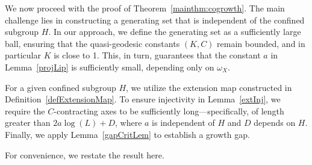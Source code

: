 \documentclass{amsart}
\numberwithin{thm}{section}
\numberwithin{figure}{section}
\theoremstyle{definition}
\theoremstyle{definition}
\theoremstyle{remark}
\numberwithin{equation}{section}
\theoremstyle{plain}
\begin{document}
We now proceed with the proof of Theorem~\ref{mainthm:cogrowth}. The main challenge lies in constructing a generating set that is independent of the confined subgroup $H$. In our approach, we define the generating set as a sufficiently large ball, ensuring that the quasi-geodesic constants $(K, C)$ remain bounded, and in particular $K$ is close to 1. This, in turn, guarantees that the constant $a$ in Lemma~\ref{projLip} is sufficiently small, depending only on $\omega_X$. 

For a given confined subgroup $H$, we utilize the extension map constructed in Definition~\ref{defExtensionMap}. To ensure injectivity in Lemma~\ref{extInj}, we require the $C$-contracting axes to be sufficiently long—specifically, of length greater than $2a \log(L) + D$, where $a$ is independent of $H$ and $D$ depends on $H$. Finally, we apply Lemma~\ref{gapCritLem} to establish a growth gap.

For convenience, we restate the result here.
\end{document}
